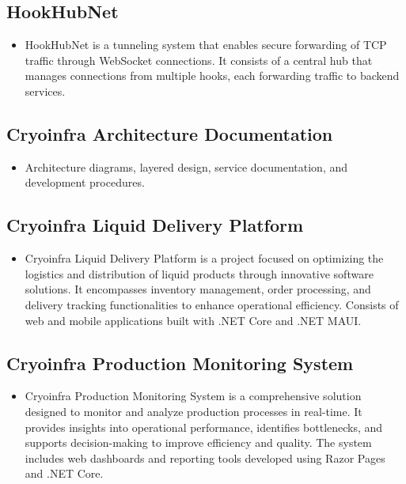 \subsection*{HookHubNet}
\begin{itemize}[leftmargin=12pt]
    \item HookHubNet is a tunneling system that enables secure forwarding of TCP traffic through WebSocket connections. It consists of a central hub that manages connections from multiple hooks, each forwarding traffic to backend services.
\end{itemize}

\subsection*{Cryoinfra Architecture Documentation}
\begin{itemize}[leftmargin=12pt]
    \item Architecture diagrams, layered design, service documentation, and development procedures.
\end{itemize}

\subsection*{Cryoinfra Liquid Delivery Platform}
\begin{itemize}[leftmargin=12pt]
    \item Cryoinfra Liquid Delivery Platform is a project focused on optimizing the logistics and distribution of liquid products through innovative software solutions. It encompasses inventory management, order processing, and delivery tracking functionalities to enhance operational efficiency. Consists of web and mobile applications built with .NET Core and .NET MAUI.
\end{itemize}

\subsection*{Cryoinfra Production Monitoring System}
\begin{itemize}[leftmargin=12pt]
    \item Cryoinfra Production Monitoring System is a comprehensive solution designed to monitor and analyze production processes in real-time. It provides insights into operational performance, identifies bottlenecks, and supports decision-making to improve efficiency and quality. The system includes web dashboards and reporting tools developed using Razor Pages and .NET Core.
\end{itemize}

